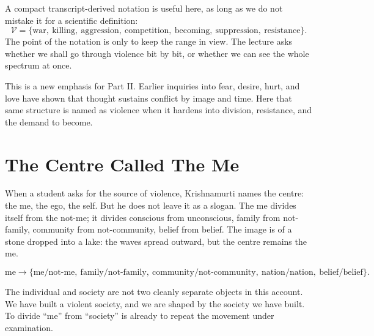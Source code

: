\documentclass[11pt,oneside]{book}
\begin{document}
A compact transcript-derived notation is useful here, as long as we do not mistake it for a scientific definition:
\begin{equation}
\mathcal{V}
=
\{\text{war},\ \text{killing},\ \text{aggression},\ \text{competition},\ \text{becoming},\ \text{suppression},\ \text{resistance}\}.
\end{equation}
The point of the notation is only to keep the range in view. The lecture asks whether we shall go through violence bit by bit, or whether we can see the whole spectrum at once.

This is a new emphasis for Part II. Earlier inquiries into fear, desire, hurt, and love have shown that thought sustains conflict by image and time. Here that same structure is named as violence when it hardens into division, resistance, and the demand to become.

\section{The Centre Called The Me}

When a student asks for the source of violence, Krishnamurti names the centre: the me, the ego, the self. But he does not leave it as a slogan. The me divides itself from the not-me; it divides conscious from unconscious, family from not-family, community from not-community, belief from belief. The image is of a stone dropped into a lake: the waves spread outward, but the centre remains the me.

\begin{equation}
\text{me}
\longrightarrow
\{\text{me/not-me},\ \text{family/not-family},\ \text{community/not-community},\ \text{nation/nation},\ \text{belief/belief}\}.
\end{equation}

\begin{figure}
\centering
{}
\end{figure}

The individual and society are not two cleanly separate objects in this account. We have built a violent society, and we are shaped by the society we have built. To divide ``me'' from ``society'' is already to repeat the movement under examination.
\end{document}
